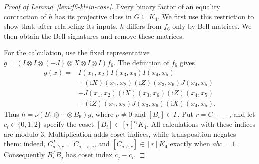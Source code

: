 \begin{proof}[Proof of Lemma~\ref{lem:f6-klein-case}]
Every binary factor of an equality contraction of $h$ has its
projective class in $G\subseteq K_4$.
We first use this restriction to show that, after relabeling its
inputs, $h$ differs from $f_6$ only by Bell matrices.
We then obtain the Bell signatures and remove these matrices.

For the calculation, use the fixed representative
$g=(I\otimes I\otimes(-J)\otimes X\otimes I\otimes I)f_6$.
The definition of $f_6$ gives
\[
\begin{aligned}
g(x)={}&I(x_1,x_2)I(x_3,x_6)I(x_4,x_5)\\
&+(\mathrm iX)(x_1,x_2)(\mathrm iZ)(x_3,x_6)J(x_4,x_5)\\
&+J(x_1,x_2)(\mathrm iX)(x_3,x_6)(\mathrm iZ)(x_4,x_5)\\
&+(\mathrm iZ)(x_1,x_2)J(x_3,x_6)(\mathrm iX)(x_4,x_5).
\end{aligned}
\]
Thus $h=\nu(B_1\otimes\cdots\otimes B_6)g$, where $\nu\ne0$
and $[B_i]\in\Gamma$.
Put $r=C_{+,+,+}$, and let $c_i\in\{0,1,2\}$ specify the
coset $[B_i]\in[r]^{c_i}K_4$.
All calculations with these indices are modulo $3$.
Multiplication adds coset indices, while transposition negates them:
indeed, $C_{a,b,c}^T=C_{a,-b,c}$, and
$[C_{a,b,c}]\in[r]K_4$ exactly when $abc=1$.
Consequently $B_i^TB_j$ has coset index $c_j-c_i$.


\end{proof}
